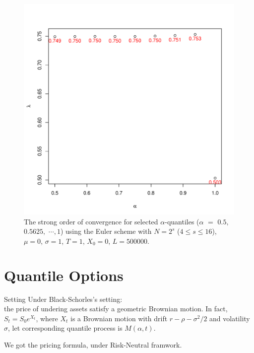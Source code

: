 \documentclass[cjk]{beamer}
\begin{document}
\begin{frame}
 \begin{figure}[p]
   \includegraphics[scale=0.4]{nout_0arato.pdf} %
   \caption{The strong order of convergence for selected $\alpha$-quantiles ($\alpha $ $=$ $ 0.5,$ $0.5625,$ $\cdots, 1$) using the Euler scheme with $N = 2^s$ ($4\le s \le 16$), $\mu=0$, $\sigma=1$, $T=1$, $X_0=0$, $L=500000$.}
   \label{f:ratio}
\end{figure}

\end{frame}

\section{Quantile Options}
\begin{frame}{Setting}
Under Black-Schorles's setting:\\
the price of undering assets 
satisfy a geometric Brownian motion. 
In fact, $S_t= S_0 e^{X_t}$, 
where $X_t$ is a Brownian motion with drift $r-\rho-\sigma^2/2$ 
and volatility $\sigma$,
let corresponding quantile process is 
$M(\alpha, t)$. 

We got the pricing formula, under Risk-Neutral framwork.
\end{frame}
\end{document}
